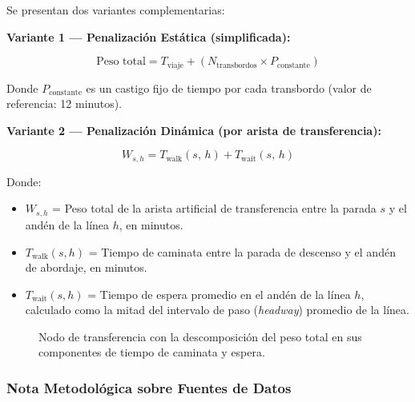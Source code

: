 Se presentan dos variantes complementarias:

\medskip
\noindent\textbf{Variante 1 --- Penalización Estática (simplificada):}

\begin{equation}
    \text{Peso total} = T_{\text{viaje}} + \left(N_{\text{transbordos}}
    \times P_{\text{constante}}\right)
    \label{eq:penalizacion-estatica}
\end{equation}

Donde $P_{\text{constante}}$ es un castigo fijo de tiempo por cada transbordo
(valor de referencia: 12 minutos).

\medskip
\noindent\textbf{Variante 2 --- Penalización Dinámica (por arista de transferencia):}

\begin{equation}
    W_{s,h} = T_{\text{walk}}(s,\, h) + T_{\text{wait}}(s,\, h)
    \label{eq:penalizacion-dinamica}
\end{equation}

Donde:
\begin{itemize}
    \item $W_{s,h}$ = Peso total de la arista artificial de transferencia entre la
    parada $s$ y el andén de la línea $h$, en minutos.
    \item $T_{\text{walk}}(s, h)$ = Tiempo de caminata entre la parada de descenso
    y el andén de abordaje, en minutos.
    \item $T_{\text{wait}}(s, h)$ = Tiempo de espera promedio en el andén de la
    línea $h$, calculado como la mitad del intervalo de paso (\textit{headway})
    promedio de la línea.
\end{itemize}


\begin{figure}[H]
    \centering
    \caption[Diagrama del indicador de Penalización por Transferencia $W_{s,h}$]{
    Nodo de transferencia con la descomposición del peso total en sus componentes
    de tiempo de caminata y espera.}
    \label{fig:indicador-W}
\end{figure}

 
\subsubsection{Nota Metodológica sobre Fuentes de Datos}

